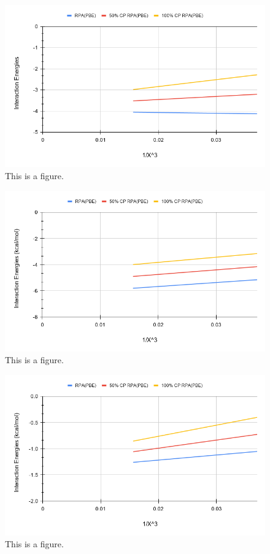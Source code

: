 \documentclass[11pt]{article}
\begin{document}
\begin{figure}
  \includegraphics[scale=0.5]{tpss_11.png}
  \caption{This is a figure.}
  \label{fig:<name>}
\end{figure}

\begin{figure}
  \includegraphics[scale=0.5]{tpss_24.png}
  \caption{This is a figure.}
  \label{fig:<name>}
\end{figure}

\begin{figure}
  \includegraphics[scale=0.5]{tpss_27.png}
  \caption{This is a figure.}
  \label{fig:<name>}
\end{figure}
\end{document}
